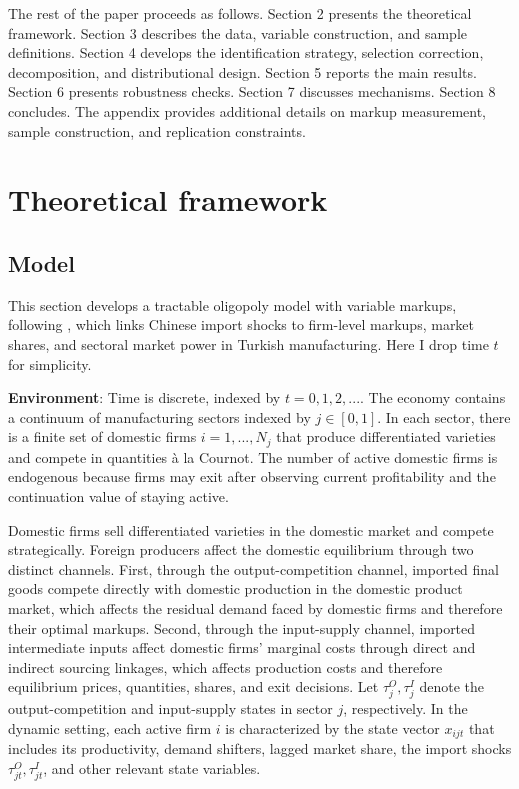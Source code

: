 \documentclass[12pt]{article}
\begin{document}
The rest of the paper proceeds as follows. Section 2 presents the theoretical framework. Section 3 describes the data, variable construction, and sample definitions. Section 4 develops the identification strategy, selection correction, decomposition, and distributional design. Section 5 reports the main results. Section 6 presents robustness checks. Section 7 discusses mechanisms. Section 8 concludes. The appendix provides additional details on markup measurement, sample construction, and replication constraints.

\section{Theoretical framework}

\subsection{Model}
This section develops a tractable oligopoly model with variable markups, following \textcite{atkesonPricingtoMarketTradeCosts2008}, which links Chinese import shocks to firm-level markups, market shares, and sectoral market power in Turkish manufacturing. Here I drop time $t$ for simplicity. 

\textbf{Environment}: Time is discrete, indexed by $t=0,1,2,...$. The economy contains a continuum of manufacturing sectors indexed by $j \in [0,1]$. In each sector, there is a finite set of domestic firms $i = 1, ..., N_j$ that produce differentiated varieties and compete in quantities à la Cournot. The number of active domestic firms is endogenous because firms may exit after observing current profitability and the continuation value of staying active. 

Domestic firms sell differentiated varieties in the domestic market and compete strategically. Foreign producers affect the domestic equilibrium through two distinct channels. First, through the output-competition channel, imported final goods compete directly with domestic production in the domestic product market, which affects the residual demand faced by domestic firms and therefore their optimal markups. Second, through the input-supply channel, imported intermediate inputs affect domestic firms' marginal costs through direct and indirect sourcing linkages, which affects production costs and therefore equilibrium prices, quantities, shares, and exit decisions. Let $\tau^O_j, \tau^I_j$ denote the output-competition and input-supply states in sector $j$, respectively. In the dynamic setting, each active firm $i$ is characterized by the state vector $x_{ijt}$ that includes its productivity, demand shifters, lagged market share, the import shocks $\tau^O_{jt}, \tau^I_{jt}$, and other relevant state variables.
\end{document}
